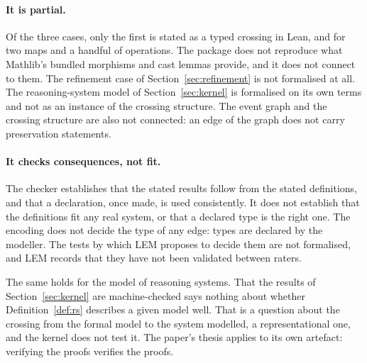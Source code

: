 \paragraph{It is partial.} Of the three cases, only the first is stated as a typed
crossing in Lean, and for two maps and a handful of operations. The package does not
reproduce what Mathlib's bundled morphisms and cast lemmas provide, and it does not
connect to them. The refinement case of Section~\ref{sec:refinement} is not formalised
at all. The reasoning-system model of Section~\ref{sec:kernel} is formalised on its own
terms and not as an instance of the crossing structure. The event graph and the
crossing structure are also not connected: an edge of the graph does not carry
preservation statements.

\paragraph{It checks consequences, not fit.} The checker establishes that the stated
results follow from the stated definitions, and that a declaration, once made, is used
consistently. It does not establish that the definitions fit any real system, or that a
declared type is the right one. The encoding does not decide the type of any edge: types
are declared by the modeller. The tests by which LEM proposes to decide them are not
formalised, and LEM records that they have not been validated between raters.

The same holds for the model of reasoning systems. That the results of
Section~\ref{sec:kernel} are machine-checked says nothing about whether
Definition~\ref{def:rs} describes a given model well. That is a question about the
crossing from the formal model to the system modelled, a representational one, and the
kernel does not test it. The paper's thesis applies to its own artefact: verifying the
proofs verifies the proofs.
